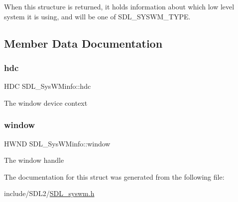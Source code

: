 When this structure is returned, it holds information about which low level system it is using, and will be one of S\+D\+L\+\_\+\+S\+Y\+S\+W\+M\+\_\+\+T\+Y\+PE. 

\subsection{Member Data Documentation}
\mbox{\label{struct_s_d_l___sys_w_minfo_a5c9d0745b083422834681e99c38b803e}} 
\subsubsection{\texorpdfstring{hdc}{hdc}}
{\footnotesize\ttfamily H\+DC S\+D\+L\+\_\+\+Sys\+W\+Minfo\+::hdc}

The window device context \mbox{\label{struct_s_d_l___sys_w_minfo_af06225591ff07e837bbd037728a525b9}} 
\subsubsection{\texorpdfstring{window}{window}}
{\footnotesize\ttfamily H\+W\+ND S\+D\+L\+\_\+\+Sys\+W\+Minfo\+::window}

The window handle 

The documentation for this struct was generated from the following file\+:\begin{DoxyCompactItemize}
\item 
include/\+S\+D\+L2/\hyperlink{_s_d_l__syswm_8h}{S\+D\+L\+\_\+syswm.\+h}\end{DoxyCompactItemize}
